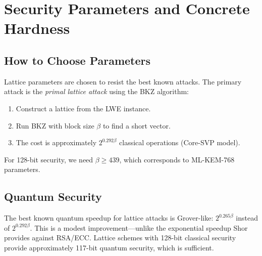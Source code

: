 \section{Security Parameters and Concrete Hardness}


\subsection{How to Choose Parameters}

Lattice parameters are chosen to resist the best known attacks. The primary attack is
the \emph{primal lattice attack} using the BKZ algorithm:

\begin{enumerate}[nosep]
  \item Construct a lattice from the LWE instance.
  \item Run BKZ with block size $\beta$ to find a short vector.
  \item The cost is approximately $2^{0.292\beta}$ classical operations (Core-SVP model).
\end{enumerate}

For 128-bit security, we need $\beta \geq 439$, which corresponds to ML-KEM-768 parameters.

\subsection{Quantum Security}

The best known quantum speedup for lattice attacks is Grover-like: $2^{0.265\beta}$
instead of $2^{0.292\beta}$. This is a modest improvement---unlike the exponential
speedup Shor provides against RSA/ECC. Lattice schemes with 128-bit classical security
provide approximately 117-bit quantum security, which is sufficient.


